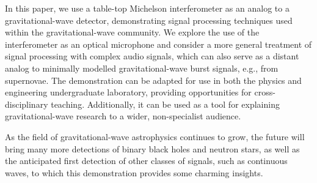 \documentclass[paper-main.tex]{subfiles}
\begin{document}


In this paper, we use a table-top Michelson interferometer as an analog to a gravitational-wave detector, demonstrating signal processing techniques used within the gravitational-wave community.
We explore the use of the interferometer as an optical microphone and consider a more general treatment of signal processing with complex audio signals, which can also serve as a distant analog to minimally modelled gravitational-wave burst signals, e.g., from supernovae.
The demonstration can be adapted for use in both the physics and engineering undergraduate laboratory, providing opportunities for cross-disciplinary teaching. 
Additionally, it can be used as a tool for explaining gravitational-wave research to a wider, non-specialist audience. 




As the field of gravitational-wave astrophysics continues to grow, the future will bring many more detections of binary black holes and neutron stars, as well as the anticipated first detection of other classes of signals, such as continuous waves, to which this demonstration provides some charming insights. 
\end{document}
